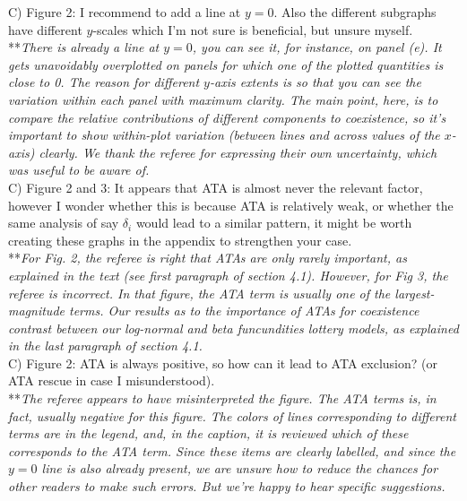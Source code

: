 \documentclass[letterpaper,11pt]{article}
\begin{document}
\noindent C) Figure 2: I recommend to add a line at $y = 0$. Also the different subgraphs have different $y$-scales which I’m not sure is beneficial, but unsure myself. \\

\noindent ***\emph{There is already a line at $y=0$, you can see it, for instance, on panel (e). 
It gets unavoidably overplotted on panels for which one of the plotted quantities is close to 0. The reason
for different $y$-axis extents is so that you can see the variation within each panel with maximum 
clarity. The main point, here, is to compare the relative contributions of different components
to coexistence, so it's important to show within-plot variation (between lines and across 
values of the $x$-axis) clearly. We thank the referee for expressing their own uncertainty, which was
useful to be aware of.} \\

\noindent C) Figure 2 and 3: It appears that ATA is almost never the relevant factor, however I wonder whether this is because ATA is relatively weak, or whether the same analysis of say $\delta_i$ would lead to a similar pattern, it might be worth creating these graphs in the appendix to strengthen your case. \\

\noindent ***\emph{For Fig. 2, the referee is right that ATAs are only rarely important, as explained in the text 
(see first paragraph of section 4.1). However, for Fig 3, the referee is incorrect. In that figure, the ATA term
is usually one of the largest-magnitude terms. Our results as to the importance of ATAs for coexistence 
contrast between our log-normal and beta funcundities lottery models, as explained in the last paragraph
of section 4.1.} \\

\noindent C) Figure 2: ATA is always positive, so how can it lead to ATA exclusion? (or ATA rescue in case I misunderstood). \\

\noindent ***\emph{The referee appears to have misinterpreted the figure. The ATA terms is, in fact, usually
negative for this figure. The colors of lines corresponding to different terms are in the legend, and, in the caption,
it is reviewed which of these corresponds to the ATA term. Since these items are clearly labelled, and since 
the $y=0$ line is also already present, we are unsure how to reduce the chances for other readers to make
such errors. But we're happy to hear specific suggestions.} \\
\end{document}
